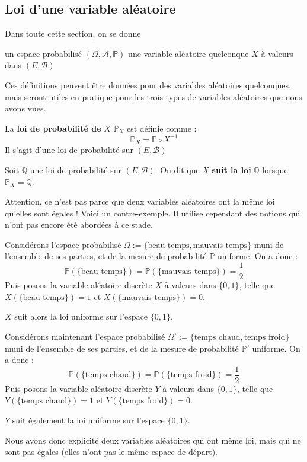 \documentclass[../integ-proba.tex]{subfiles}
\begin{document}
\subsection{Loi d'une variable aléatoire}

Dans toute cette section, on se donne
\begin{itemize}
    \itemb un espace probabilisé $\left(\Omega, \mathcal{A}, \mathbb{P}\right)$
    \itemb une variable aléatoire quelconque $X$ à valeurs dans $\left(E, \mathcal{B}\right)$
\end{itemize}

Ces définitions peuvent être données pour des variables aléatoires quelconques, mais seront utiles en pratique pour les trois types de variables aléatoires que nous avons vues.

\begin{defi}
    La \textbf{loi de probabilité de} $X$ $\mathbb{P}_X$ est définie comme :
    $$
    \mathbb{P}_X=\mathbb{P} \circ X^{-1}
    $$
    Il s'agit d'une loi de probabilité sur $\left(E, \mathcal{B} \right)$
\end{defi}

\begin{defi}
    Soit $\mathbb{Q}$ une loi de probabilité sur $\left(E, \mathcal{B} \right)$.
    On dit que $X$ \textbf{suit la loi} $\mathbb{Q}$ lorsque $\mathbb{P}_X = \mathbb{Q}$.
\end{defi}

\begin{rem}
    Attention, ce n'est pas parce que deux variables aléatoires ont la même loi qu'elles sont égales !
    Voici un contre-exemple. Il utilise cependant des notions qui n'ont pas encore été abordées à ce stade.
    
    Considérons l'espace probabilisé $\Omega := \{\text{beau temps}, \text{mauvais temps}\}$ muni de l'ensemble de ses parties, et de la mesure de probabilité $\mathbb{P}$ uniforme.
    On a donc :
    $$
    \mathbb{P}(\{\text{beau temps}\}) = \mathbb{P}(\{\text{mauvais temps}\}) = \frac{1}{2}
    $$
    Puis posons la variable aléatoire discrète $X$ à valeurs dans $\{0,1\}$, telle que $X(\{\text{beau temps}\})=1$ et $X(\{\text{mauvais temps}\})=0$.
    
    $X$ suit alors la loi uniforme sur l'espace $\{0,1\}$.

    Considérons maintenant l'espace probabilisé $\Omega' := \{\text{temps chaud}, \text{temps froid}\}$ muni de l'ensemble de ses parties, et de la mesure de probabilité $\mathbb{P}'$ uniforme.
    On a donc :
    $$
    \mathbb{P}(\{\text{temps chaud}\}) = \mathbb{P}(\{\text{temps froid}\}) = \frac{1}{2}
    $$
    Puis posons la variable aléatoire discrète $Y$ à valeurs dans $\{0,1\}$, telle que $Y(\{\text{temps chaud}\})=1$ et $Y(\{\text{temps froid}\})=0$.

    $Y$ suit également la loi uniforme sur l'espace $\{0,1\}$.

    Nous avons donc explicité deux variables aléatoires qui ont même loi, mais qui ne sont pas égales (elles n'ont pas le même espace de départ).
\end{rem}
\end{document}
